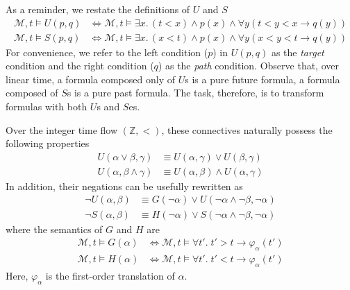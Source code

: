 \documentclass[a4paper,UKenglish,cleveref, autoref, thm-restate, numberwithinsect]{lipics-v2021}
\begin{document}
As a reminder, we restate the definitions of $U$ and $S$
\begin{equation*}
    \begin{aligned}
        \mathcal{M}, t \vDash U(p, q) &\Longleftrightarrow \mathcal{M}, t \vDash \exists x.\, (t < x) \land p(x) \land \forall y \left( t < y < x \to q\left( y \right) \right)\\
        \mathcal{M}, t \vDash S(p, q) &\Longleftrightarrow \mathcal{M}, t \vDash \exists x.\, (x < t) \land p(x) \land \forall y \left( x < y < t \to q\left( y \right) \right)
    \end{aligned}
\end{equation*}
For convenience, we refer to the left condition ($p$) in $U(p, q)$ as the \textit{target} condition and the right condition ($q$) as the \textit{path} condition. Observe that, over linear time, a formula composed only of $U$s is a pure future formula, a formula composed of $S$s is a pure past formula. The task, therefore, is to transform formulas with both $U$s and $S$es.

Over the integer time flow $(\mathbb{Z}, <)$, these connectives naturally possess the following properties
\begin{equation}
    \label{eq:or-and-S-U}
    \begin{aligned}
        U(\alpha \lor \beta, \gamma) &\equiv U(\alpha, \gamma) \lor U(\beta, \gamma)\\
        U(\alpha, \beta \land \gamma) &\equiv U(\alpha, \beta) \land U(\alpha, \gamma)
    \end{aligned}
\end{equation}
In addition, their negations can be usefully rewritten as
\begin{equation*}
    \begin{aligned}
        \lnot U(\alpha, \beta) &\equiv G(\lnot \alpha) \lor U(\lnot \alpha \land \lnot \beta, \lnot \alpha) \\
        \lnot S(\alpha, \beta) &\equiv H(\lnot \alpha) \lor S(\lnot \alpha \land \lnot \beta, \lnot \alpha)
    \end{aligned}
\end{equation*}
where the semantics of $G$ and $H$ are
\begin{equation*}
    \begin{aligned}
        \mathcal{M}, t \vDash G(\alpha) &\Longleftrightarrow \mathcal{M}, t \vDash \forall t'.\; t' > t \to \varphi_\alpha(t') \\
        \mathcal{M}, t \vDash H(\alpha) &\Longleftrightarrow \mathcal{M}, t \vDash \forall t'.\; t' < t \to \varphi_\alpha(t')
    \end{aligned}
\end{equation*}
Here, $\varphi_\alpha$ is the first-order translation of $\alpha$.
\end{document}
